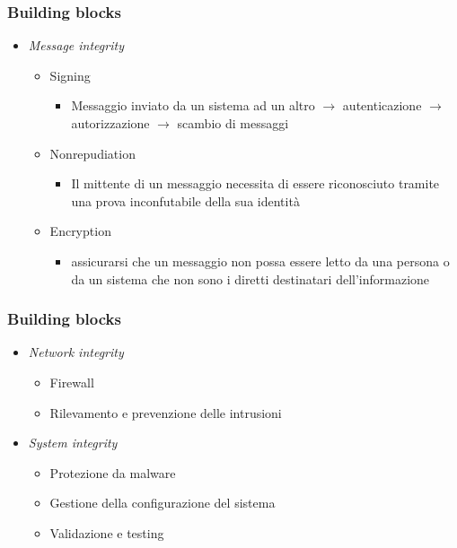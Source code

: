 \begin{frame}
  \frametitle{Building blocks}
  \begin{itemize}[<+- | alert@+>]
  \item \textit{Message integrity}
  \begin{itemize}
  \item Signing
  	\begin{itemize}
  	\item Messaggio inviato da un sistema ad un altro $\rightarrow$ autenticazione $\rightarrow$ autorizzazione $\rightarrow$ scambio di messaggi
  	\end{itemize}
  \item Nonrepudiation
    \begin{itemize}
  	\item Il mittente di un messaggio necessita di essere riconosciuto tramite una prova inconfutabile della sua identità
  	\end{itemize}
  \item Encryption
    \begin{itemize}
  	\item assicurarsi che un messaggio non possa essere letto da una persona o da un sistema che non sono i diretti destinatari dell’informazione
  	\end{itemize}
 	\end{itemize}
  \end{itemize}
\end{frame}

\begin{frame}
  \frametitle{Building blocks}
  \begin{itemize}[<+- | alert@+>]
  \item \textit{Network integrity}
  \begin{itemize}
  \item Firewall
  \item Rilevamento e prevenzione delle intrusioni
 	\end{itemize}
   \item \textit{System integrity}
     \begin{itemize}
  \item Protezione da malware
  \item Gestione della configurazione del sistema
  \item Validazione e testing
 	\end{itemize}
  \end{itemize}
\end{frame}

